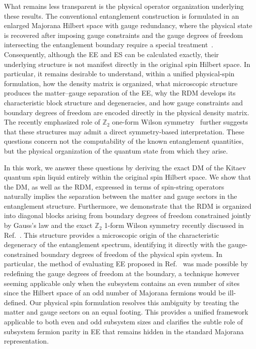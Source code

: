 {What remains less transparent is the physical operator organization underlying these results. The conventional entanglement construction is formulated in an enlarged Majorana Hilbert space with gauge redundancy, where the physical state is recovered after imposing gauge constraints and the gauge degrees of freedom intersecting the entanglement boundary require a special treatment~\cite{Yao-Qi_2010}. Consequently, although the EE and ES can be calculated exactly, their underlying structure is not manifest directly in the original spin Hilbert space. In particular, it remains desirable to understand, within a unified physical-spin formulation, how the density matrix is organized, what microscopic structure produces the matter--gauge separation of the EE, why the RDM develops its characteristic block structure and degeneracies, and how gauge constraints and boundary degrees of freedom are encoded directly in the physical density matrix. The recently emphasized role of $\mathbb{Z}_2$ one-form Wilson symmetry~\cite{Xu-Rakovszky-Knap-Pollmann_2025} further suggests that these structures may admit a direct symmetry-based interpretation. These questions concern not the computability of the known entanglement quantities, but the physical organization of the quantum state from which they arise.

In this work, we answer these questions by deriving the exact DM of the Kitaev quantum spin liquid entirely within the original spin Hilbert space. {We show that the DM, as well as the RDM, expressed in terms of spin-string operators naturally implies the separation between the matter and gauge sectors in the entanglement structure. Furthermore, we demonstrate that the RDM is organized into diagonal blocks arising from boundary degrees of freedom constrained jointly by Gauss's law and the exact $\mathbb{Z}_2$ 1-form Wilson symmetry recently discussed in Ref.~\cite{Xu-Rakovszky-Knap-Pollmann_2025}. This structure provides a microscopic origin of the characteristic degeneracy of the entanglement spectrum, identifying it directly with the gauge-constrained boundary degrees of freedom of the physical spin system. In particular, the method of evaluating EE proposed in Ref.~\cite{Yao-Qi_2010} was made possible by redefining the gauge degrees of freedom at the boundary, a technique however seeming applicable only when the subsystem contains an even number of sites since the Hilbert space of an odd number of Majorana fermions would be ill-defined. Our physical spin formulation resolves this ambiguity by treating the matter and gauge sectors on an equal footing. This provides a unified framework applicable to both even and odd subsystem sizes and clarifies the subtle role of subsystem fermion parity in EE that remains hidden in the standard Majorana representation.
}

}
